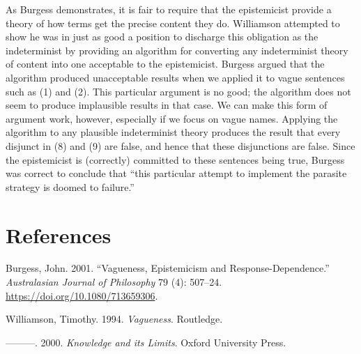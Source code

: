 \documentclass[
  11pt,
  letterpaper,
  DIV=11,
  numbers=noendperiod,
  oneside]{scrartcl}
\newlength{\cslhangindent}
\newenvironment{CSLReferences}[2] %
 {\begin{list}{}{%
  \setlength{\itemindent}{0pt}
  \setlength{\leftmargin}{0pt}
  \setlength{\parsep}{0pt}
  \ifodd #1
   \setlength{\leftmargin}{\cslhangindent}
   \setlength{\itemindent}{-1\cslhangindent}
  \fi
  \setlength{\itemsep}{#2\baselineskip}}}
 {\end{list}}
\begin{document}
As Burgess demonstrates, it is fair to require that the epistemicist
provide a theory of how terms get the precise content they do.
Williamson attempted to show he was in just as good a position to
discharge this obligation as the indeterminist by providing an algorithm
for converting any indeterminist theory of content into one acceptable
to the epistemicist. Burgess argued that the algorithm produced
unacceptable results when we applied it to vague sentences such as (1)
and (2). This particular argument is no good; the algorithm does not
seem to produce implausible results in that case. We can make this form
of argument work, however, especially if we focus on vague names.
Applying the algorithm to any plausible indeterminist theory produces
the result that every disjunct in (8) and (9) are false, and hence that
these disjunctions are false. Since the epistemicist is (correctly)
committed to these sentences being true, Burgess was correct to conclude
that ``this particular attempt to implement the parasite strategy is
doomed to failure.''

\section*{References}\label{references}

\label{refs}
\begin{CSLReferences}{1}{0}
Burgess, John. 2001. {``Vagueness, Epistemicism and
Response-Dependence.''} \emph{Australasian Journal of Philosophy} 79
(4): 507--24. \url{https://doi.org/10.1080/713659306}.

Williamson, Timothy. 1994. \emph{{Vagueness}}. Routledge.

---------. 2000. \emph{{Knowledge and its Limits}}. Oxford University
Press.

\end{CSLReferences}
\end{document}
